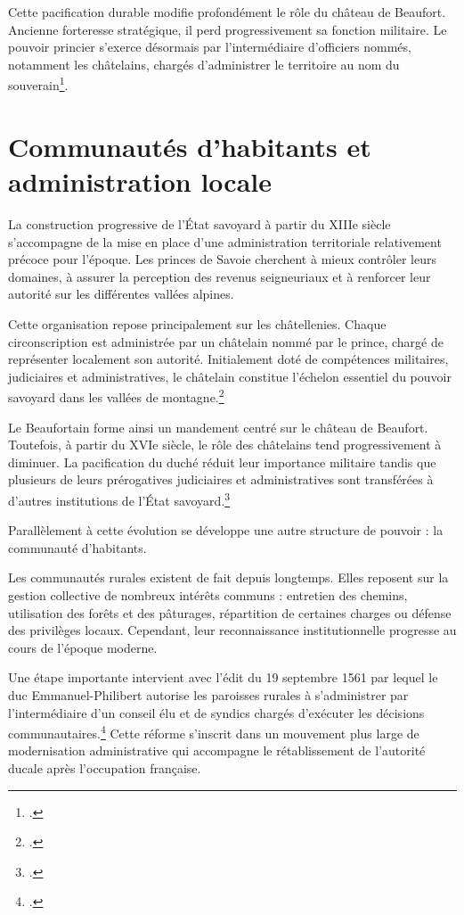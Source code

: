\documentclass[12pt,a4paper]{report}
\begin{document}
Cette pacification durable modifie profondément le rôle du château de Beaufort. Ancienne forteresse stratégique, il perd progressivement sa fonction militaire. Le pouvoir princier s'exerce désormais par l'intermédiaire d'officiers nommés, notamment les châtelains, chargés d'administrer le territoire au nom du souverain\footcite{Ducretet1990}.

\section{Communautés d'habitants et administration locale}

La construction progressive de l'État savoyard à partir du XIIIe siècle s'accompagne de la mise en place d'une administration territoriale relativement précoce pour l'époque. Les princes de Savoie cherchent à mieux contrôler leurs domaines, à assurer la perception des revenus seigneuriaux et à renforcer leur autorité sur les différentes vallées alpines.

Cette organisation repose principalement sur les châtellenies. Chaque circonscription est administrée par un châtelain nommé par le prince, chargé de représenter localement son autorité. Initialement doté de compétences militaires, judiciaires et administratives, le châtelain constitue l'échelon essentiel du pouvoir savoyard dans les vallées de montagne.\footcite[59]{Mouthon2016}

Le Beaufortain forme ainsi un mandement centré sur le château de Beaufort. Toutefois, à partir du XVIe siècle, le rôle des châtelains tend progressivement à diminuer. La pacification du duché réduit leur importance militaire tandis que plusieurs de leurs prérogatives judiciaires et administratives sont transférées à d'autres institutions de l'État savoyard.\footcite[138]{Gachet2011GabelleSel1561}

\vspace{1em}

Parallèlement à cette évolution se développe une autre structure de pouvoir : la communauté d'habitants.

Les communautés rurales existent de fait depuis longtemps. Elles reposent sur la gestion collective de nombreux intérêts communs : entretien des chemins, utilisation des forêts et des pâturages, répartition de certaines charges ou défense des privilèges locaux. Cependant, leur reconnaissance institutionnelle progresse au cours de l'époque moderne.

Une étape importante intervient avec l'édit du 19 septembre 1561 par lequel le duc Emmanuel-Philibert autorise les paroisses rurales à s'administrer par l'intermédiaire d'un conseil élu et de syndics chargés d'exécuter les décisions communautaires.\footcite[139]{Gachet2011GabelleSel1561} Cette réforme s'inscrit dans un mouvement plus large de modernisation administrative qui accompagne le rétablissement de l'autorité ducale après l'occupation française.
\end{document}
